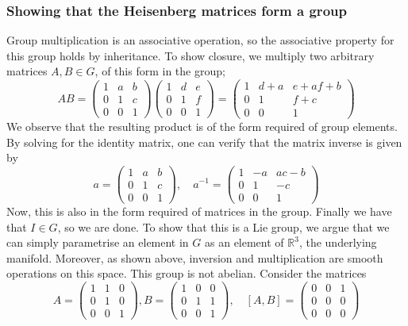 \documentclass[11pt, oneside]{article}   	%
\theoremstyle{slanted}
\begin{document}
\subsubsection*{Showing that the Heisenberg matrices form a group} 
Group multiplication is an associative operation, so the associative property for this group holds by inheritance. To show closure, we multiply two arbitrary matrices $A, B \in G$, of this form in the group; 
\[ 
AB =  \begin{pmatrix} 1 & a & b \\ 0 & 1 & c \\ 0 & 0 & 1 \end{pmatrix} \begin{pmatrix} 1 & d & e \\ 0 & 1 & f \\ 0 & 0 & 1 \end{pmatrix}  = 
\begin{pmatrix} 1 & d + a & e + af + b \\ 0 & 1 & f + c \\ 0 & 0 & 1 \end{pmatrix} 
\] We observe that the resulting product is of the form required of group elements. By solving for the identity matrix, one can verify that the matrix inverse is given by 
\[ 
a= \begin{pmatrix} 1 & a & b \\ 0 & 1 & c \\ 0 & 0 & 1 \end{pmatrix}, \quad a^{ - 1}  = \begin{pmatrix} 1 & -a & ac - b \\ 0 & 1 & -c \\ 0 & 0 & 1 \end{pmatrix} 
\] Now, this is also in the form required of matrices in the group. Finally we have that $I \in G$, so we are done. To show that this is a Lie group, we argue that we can simply parametrise an element in $G$ as an element of $\mathbb{ R}^3 $, the underlying manifold. Moreover, as shown above, inversion and multiplication are smooth operations on this space. This group is not abelian. Consider the matrices
\[ 
A = \begin{pmatrix} 1 & 1 & 0 \\ 0 & 1 & 0 \\ 0 & 0 & 1 \end{pmatrix}, B = \begin{pmatrix} 1 & 0 & 0 \\ 0 & 1 & 1 \\ 0 & 0 & 1 \end{pmatrix}, \quad [ A , B ] = \begin{pmatrix} 0 & 0 & 1 \\ 0 & 0 & 0 \\ 0 & 0 & 0 \end{pmatrix} 
\] 
\end{document}
